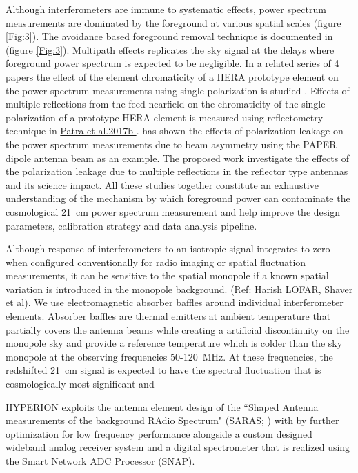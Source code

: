 \documentclass[12pt]{amsart}
\begin{document}
 Although interferometers are immune to systematic effects, power spectrum measurements are dominated by the foreground at various spatial scales (figure \ref{Fig:3}). 
The avoidance based foreground removal technique is documented in \cite{Parsons2010} (figure \ref{Fig:3}).
Multipath effects replicates the sky signal at the delays where foreground power spectrum is expected to be negligible. 
In a related series of 4 papers the effect of the element chromaticity of a HERA prototype element on the power spectrum measurements using single polarization is studied  \cite{Thyagarajan3, deBoer2016, Ewall16}. Effects of multiple reflections from the feed nearfield on the chromaticity of the single polarization of a prototype HERA element is measured using reflectometry technique in  \href{https://arxiv.org/pdf/1701.03209.pdf}{Patra et al.2017b \cite{Patra17}}. \cite{Moore} has shown the effects of polarization leakage on the power spectrum measurements due to beam asymmetry using the PAPER dipole antenna beam as an example. 
 The proposed work investigate the effects of the polarization leakage due to multiple reflections in the reflector type antennas and its science impact. All these studies together constitute an exhaustive understanding of the mechanism by which foreground power can contaminate the cosmological 21~cm power spectrum measurement and help improve the design parameters, calibration strategy and data analysis pipeline.







 Although response of interferometers to an isotropic signal integrates to zero when configured conventionally for radio imaging or spatial fluctuation measurements, it can be sensitive to the spatial monopole if a known spatial variation is introduced in the monopole background. (Ref: Harish LOFAR, Shaver et al). We use electromagnetic absorber baffles around individual interferometer elements. Absorber baffles are thermal emitters at ambient temperature that partially covers the antenna beams while creating a artificial discontinuity on the monopole sky and provide a reference temperature which is colder than the sky monopole at the observing frequencies 50-120~MHz. At these frequencies, the redshifted 21~cm signal is expected to have the spectral fluctuation that is cosmologically most significant and 

HYPERION exploits the antenna element design of the ``Shaped Antenna measurements of the background RAdio Spectrum" (SARAS; ) with by further optimization for low frequency performance alongside a custom designed wideband analog receiver system and a digital spectrometer that is realized using the Smart Network ADC Processor (SNAP).   
\end{document}
